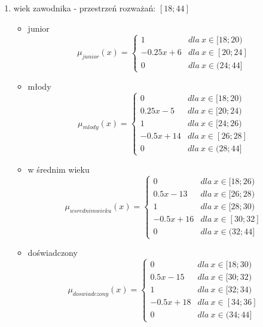 \documentclass{classrep}
\begin{document}
\begin{enumerate}
    \item wiek zawodnika - przestrzeń rozważań: $[18;44]$
    \begin{itemize}
        \item junior
        \begin{equation}
            \mu_{junior}(x) = \left\{\begin{matrix} 1 & dla \: x\in[18;20) \\ -0.25x + 6 & dla \: x\in [20; 24] \\ 0 & dla \: x\in (24;44] \end{matrix}\right.
        \end{equation}
        \item młody
        \begin{equation}
            \mu_{mlody}(x) = \left\{\begin{matrix}  0 & dla \: x\in [18;20) \\ 0.25x-5 & dla \: x\in[20;24) \\ 1 & dla \: x\in [24; 26) \\ -0.5x + 14 & dla \: x\in[26;28] \\ 0 & dla \: x\in (28;44] \end{matrix}\right.
        \end{equation}
        \item w średnim wieku
        \begin{equation}
            \mu_{w srednim wieku}(x) = \left\{\begin{matrix} 0 & dla \: x\in [18;26) \\ 0.5x - 13 & dla \: x\in[26;28) \\ 1 & dla \: x\in [28; 30) \\ -0.5x + 16 & dla \: x\in[30;32] \\ 0 & dla \: x\in (32;44]  \end{matrix}\right.
        \end{equation}
        \item doświadczony
        \begin{equation}
            \mu_{doswiadczony}(x) = \left\{\begin{matrix}  0 & dla \: x\in [18;30) \\ 0.5x - 15 & dla \: x\in[30;32) \\ 1 & dla \: x\in [32; 34) \\ -0.5x + 18 & dla \: x\in[34;36] \\ 0 & dla \: x\in (34;44] \end{matrix}\right.

\end{equation}
\end{itemize}
\end{enumerate}
\end{document}
